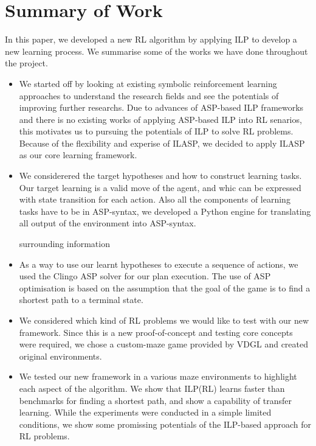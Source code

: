\section{Summary of Work}
\label{sec:summary_of_work}

In this paper, we developed a new RL algorithm by applying ILP to develop a new learning process.
We summarise some of the works we have done throughout the project.

\begin{itemize}
\item We started off by looking at existing symbolic reinforcement learning approaches to understand the research fields and see the potentials of improving further researchs.
Due to advances of ASP-based ILP frameworks and there is no existing works of applying ASP-based ILP into RL senarios, this motivates us to pursuing the potentials of ILP to solve RL problems.
Because of the flexibility and experise of ILASP, we decided to apply ILASP as our core learning framework.

\item We considerered the target hypotheses and how to construct learning tasks. Our target learning is a valid move of the agent, and whic can be expressed with state transition for each action.
Also all the components of learning tasks have to be in ASP-syntax, we developed a Python engine for translating all output of the environment into ASP-syntax.

surrounding information

\item As a way to use our learnt hypotheses to execute a sequence of actions, we used the Clingo ASP solver for our plan execution. 
The use of ASP optimisation is based on the assumption that the goal of the game is to find a shortest path to a terminal state.

\item We considered which kind of RL problems we would like to test with our new framework. Since this is a new proof-of-concept and testing core concepts were required, we chose a custom-maze game provided by VDGL and created original environments.

\item We tested our new framework in a various maze environments to highlight each aspect of the algorithm. We show that ILP(RL) learns faster than benchmarks for finding a shortest path, and show a capability of transfer learning.
While the experiments were conducted in a simple limited conditions, we show some promissing potentials of the ILP-based approach for RL problems.

\end{itemize}

